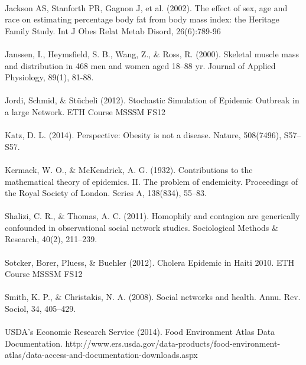 \documentclass[11pt]{article}
\begin{document}
\paragraph{}
Jackson AS, Stanforth PR, Gagnon J, et al. (2002). The effect of sex, age and race on estimating percentage body fat from body mass index: the Heritage Family Study. Int J Obes Relat Metab Disord, 26(6):789-96
\paragraph{}
Janssen, I., Heymsfield, S. B., Wang, Z., & Ross, R. (2000). Skeletal muscle mass and distribution in 468 men and women aged 18–88 yr. Journal of Applied Physiology, 89(1), 81-88.
 \paragraph{}
Jordi, Schmid, \& Stücheli (2012). Stochastic Simulation of Epidemic Outbreak in a large Network. ETH Course MSSSM FS12
\paragraph{}
Katz, D. L. (2014). Perspective: Obesity is not a disease. Nature, 508(7496), S57–S57. 
\paragraph{}
Kermack, W. O., \& McKendrick, A. G. (1932). Contributions to the mathematical theory of epidemics. II. The problem of endemicity. Proceedings of the Royal Society of London. Series A, 138(834), 55–83.
\paragraph{}
Shalizi, C. R., \& Thomas, A. C. (2011). Homophily and contagion are generically confounded in observational social network studies. Sociological Methods & Research, 40(2), 211–239.
\paragraph{}
Sotcker, Borer, Pluess, \& Buehler (2012). Cholera Epidemic in Haiti 2010. ETH Course MSSSM FS12
\paragraph{}
Smith, K. P., \& Christakis, N. A. (2008). Social networks and health. Annu. Rev. Sociol, 34, 405–429.
\paragraph{}
USDA's Economic Research Service (2014). Food Environment Atlas Data Documentation. http://www.ers.usda.gov/data-products/food-environment-atlas/data-access-and-documentation-downloads.aspx
\end{document}
